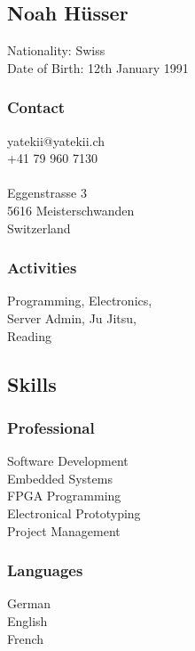 \documentclass[]{resume}
\begin{document}

\begin{facts}
\section{Noah Hüsser}
\sectionsep
\sectionsep

Nationality: Swiss\\
Date of Birth: 12th January 1991
\sectionsep

\subsubsection{Contact}
yatekii@yatekii.ch\\
+41 79 960 7130\\
\\
Eggenstrasse 3\\
5616 Meisterschwanden\\
Switzerland
\sectionsep

\subsubsection{Activities}
Programming, Electronics,\\
Server Admin, Ju Jitsu,\\
Reading
\sectionsep


\subsection{Skills}

\subsubsection{Professional}
Software Development\\
Embedded Systems\\
FPGA Programming\\
Electronical Prototyping\\
Project Management
\sectionsep

\subsubsection{Languages}
German \\
English \\
French 
\sectionsep


\end{facts}
\end{document}
